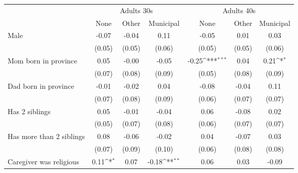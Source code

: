 {
\def\sym#1{\ifmmode^{#1}\else\(^{#1}\)\fi}
\begin{tabular}{l*{6}{c}}
\toprule
 &\multicolumn{3}{c}{Adults 30s}&\multicolumn{3}{c}{Adults 40s} \\
                    &\multicolumn{1}{c}{None}&\multicolumn{1}{c}{Other}&\multicolumn{1}{c}{Municipal}&\multicolumn{1}{c}{None}&\multicolumn{1}{c}{Other}&\multicolumn{1}{c}{Municipal}\\
\midrule
Male                &       -0.07         &       -0.04         &        0.11         &       -0.05         &        0.01         &        0.03         \\
                    &      (0.05)         &      (0.05)         &      (0.06)         &      (0.05)         &      (0.05)         &      (0.06)         \\
\addlinespace
Mom born in province&        0.05         &       -0.00         &       -0.05         &       -0.25\sym{***}&        0.04         &        0.21\sym{*}  \\
                    &      (0.07)         &      (0.08)         &      (0.09)         &      (0.05)         &      (0.08)         &      (0.09)         \\
\addlinespace
Dad born in province&       -0.01         &       -0.02         &        0.04         &       -0.08         &       -0.04         &        0.11         \\
                    &      (0.07)         &      (0.08)         &      (0.09)         &      (0.06)         &      (0.07)         &      (0.07)         \\
\addlinespace
Has 2 siblings      &        0.05         &       -0.01         &       -0.04         &        0.06         &       -0.08         &        0.02         \\
                    &      (0.05)         &      (0.07)         &      (0.08)         &      (0.06)         &      (0.07)         &      (0.07)         \\
\addlinespace
Has more than 2 siblings&        0.08         &       -0.06         &       -0.02         &        0.04         &       -0.07         &        0.03         \\
                    &      (0.07)         &      (0.09)         &      (0.10)         &      (0.06)         &      (0.08)         &      (0.08)         \\
\addlinespace
Caregiver was religious&        0.11\sym{*}  &        0.07         &       -0.18\sym{**} &        0.06         &        0.03         &       -0.09         \\

\end{tabular}}

